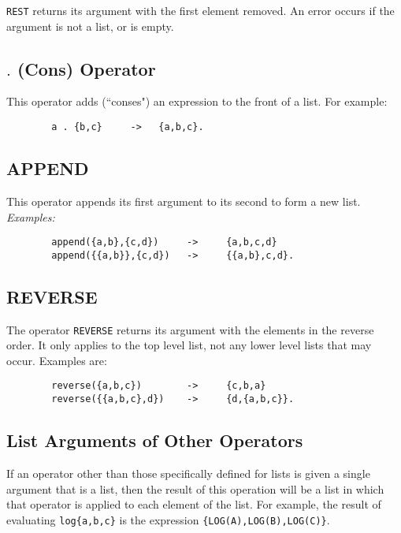 {\tt REST}  returns its argument with the first element
removed.  An error occurs if the argument is not a list, or is empty.

\subsection{ $.$ (Cons) Operator}

This operator adds (``conses") an expression to the
front of a list.  For example:
\begin{verbatim}
        a . {b,c}     ->   {a,b,c}.
\end{verbatim}

\subsection{APPEND}

This operator appends its first argument to its second to
form a new list.
{\it Examples:}
\begin{verbatim}
        append({a,b},{c,d})     ->     {a,b,c,d}
        append({{a,b}},{c,d})   ->     {{a,b},c,d}.
\end{verbatim}

\subsection{REVERSE}

The operator {\tt REVERSE} returns its argument with the
elements in the reverse order.  It only applies to the top level list, not
any lower level lists that may occur.  Examples are:
\begin{verbatim}
        reverse({a,b,c})        ->     {c,b,a}
        reverse({{a,b,c},d})    ->     {d,{a,b,c}}.
\end{verbatim}

\subsection{List Arguments of Other Operators}

If an operator other than those specifically defined for lists is given a
single argument that is a list, then the result of this operation will be
a list in which that operator is applied to each element of the list.  For
example, the result of evaluating {\tt log\{a,b,c\}} is the expression
{\tt \{LOG(A),LOG(B),LOG(C)\}}.

